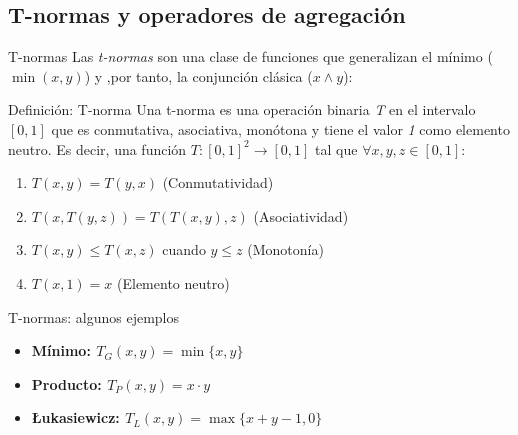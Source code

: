 \documentclass{beamer}
\begin{document}
\subsection{T-normas y operadores de agregación}
\begin{frame}{T-normas}
	  Las \emph{t-normas} son una clase de funciones que generalizan el mínimo ($\min(x,y)$) y ,por tanto, la conjunción clásica ($x\wedge y$):
      \begin{block}{Definición: T-norma}
		Una t-norma es una operación binaria \emph{T} en el intervalo $[0,1]$ que es conmutativa, asociativa, monótona y tiene el valor \emph{1} como elemento neutro. Es decir, una función $T : [0,1]^2 \rightarrow [0,1]$ tal que $\forall x,y,z \in [0,1]$:
		\begin{enumerate}
		   \item $T(x,y) = T(y,x)$ (Conmutatividad)
		   \item $T(x,T(y,z)) = T(T(x,y),z)$ (Asociatividad)
		   \item $T(x,y) \leq T(x,z)$ cuando $y \leq z$ (Monotonía)
		   \item $T(x,1) = x$ (Elemento neutro)
		  \end{enumerate}
      \end{block}
\end{frame}

\begin{frame}{T-normas: algunos ejemplos}
	\begin{itemize}
		\item \bfseries Mínimo: $T_{G}(x,y) = \min\{x,y\}$
		\item \bfseries Producto: $T_{P}(x,y) = x \cdot y$
		\item \bfseries \L{}ukasiewicz: $T_{L}(x,y) = \max\{x+y-1,0\}$
	\end{itemize}
	\vspace{0.2cm}
	\newlength\figureheight
    \newlength\figurewidth 
	\setlength\figureheight{2cm}
	\setlength\figurewidth{3cm}
	
	\setlength\figureheight{2cm}
	\setlength\figurewidth{3cm}
	
	\centering
	\setlength\figureheight{2cm}
	\setlength\figurewidth{3cm}
	
\end{frame}
\end{document}
